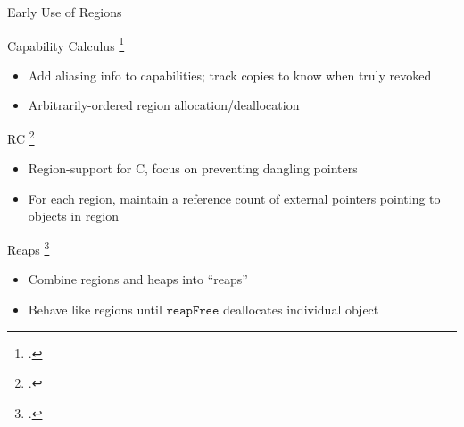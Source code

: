 \documentclass[aspectratio=169]{beamer}
\begin{document}
\begin{frame}{Early Use of Regions}
    \footnotesize{
Capability Calculus \footcite{crary_typed_1999}
    \begin{itemize}
        \item Add aliasing info to capabilities; track copies to know when truly revoked
        \item Arbitrarily-ordered region allocation/deallocation
    \end{itemize}
\pause
RC \footcite{gay_language_2001}
    \vspace{-0.1in}
   \begin{itemize}
     \item Region-support for C, focus on preventing dangling pointers %
     \item For each region, maintain a reference count of external pointers pointing to objects in region %
   \end{itemize}
\pause
Reaps \footcite{berger_reconsidering_2002}
    \vspace{-0.1in}
   \begin{itemize}
     \item Combine regions and heaps into ``reaps''
     \item Behave like regions until $\texttt{reapFree}$ deallocates individual object
   \end{itemize}

}
\end{frame}
\end{document}
